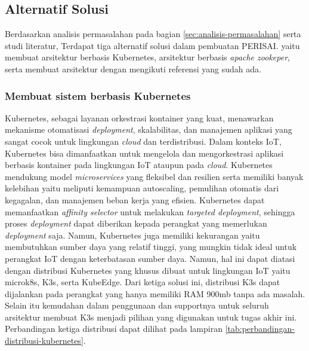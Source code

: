 \subsection{Alternatif Solusi}
\label{sec:analisis-solusi}

Berdasarkan analisis permasalahan pada bagian \ref{sec:analisis-permasalahan} serta studi literatur, Terdapat tiga alternatif solusi dalam pembuatan PERISAI. yaitu membuat arsitektur berbasis Kubernetes, arsitektur berbasis \textit{apache zookeper}, serta membuat arsitektur dengan mengikuti referensi yang sudah ada.

\subsubsection{Membuat sistem berbasis Kubernetes}
Kubernetes, sebagai layanan orkestrasi kontainer yang kuat, menawarkan mekanisme otomatisasi \textit{deployment}, skalabilitas, dan manajemen aplikasi yang sangat cocok untuk lingkungan \textit{cloud} dan terdistribusi. Dalam konteks IoT, Kubernetes bisa dimanfaatkan untuk mengelola dan mengorkestrasi aplikasi berbasis kontainer pada lingkungan IoT ataupun pada \textit{cloud}. Kubernetes mendukung model \textit{microservices} yang fleksibel dan resilien serta memiliki banyak kelebihan yaitu meliputi kemampuan autoscaling, pemulihan otomatis dari kegagalan, dan manajemen beban kerja yang efisien. Kubernetes dapat memanfaatkan \textit{affinity selector} untuk melakukan \textit{targeted deployment}, sehingga proses \textit{deployment} dapat diberikan kepada perangkat yang memerlukan \textit{deployment} saja. Namun, Kubernetes juga memiliki kekurangan yaitu membutuhkan sumber daya yang relatif tinggi, yang mungkin tidak ideal untuk perangkat IoT dengan keterbatasan sumber daya. Namun, hal ini dapat diatasi dengan distribusi Kubernetes yang khusus dibuat untuk lingkungan IoT yaitu microk8s, K3s, serta KubeEdge. Dari ketiga solusi ini, distribusi K3s dapat dijalankan pada perangkat yang hanya memiliki RAM 900mb tanpa ada masalah. Selain itu kemudahan dalam penggunaan dan supportnya untuk seluruh arsitektur membuat K3s menjadi pilihan yang digunakan untuk tugas akhir ini. Perbandingan ketiga distribusi dapat dilihat pada lampiran \ref{tab:perbandingan-distribusi-kubernetes}.

